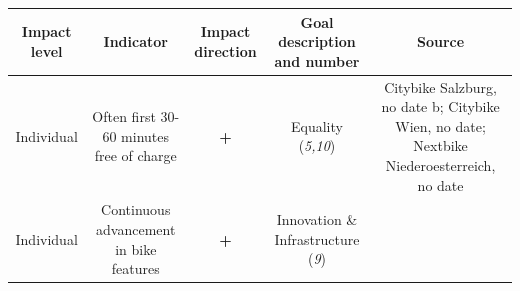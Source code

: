 \documentclass[
]{book}
\begin{document}
\begin{longtable}[]{@{}ccccc@{}}
\toprule
\begin{minipage}[b]{0.17\columnwidth}\centering
Impact level\strut
\end{minipage} & \begin{minipage}[b]{0.16\columnwidth}\centering
Indicator\strut
\end{minipage} & \begin{minipage}[b]{0.17\columnwidth}\centering
Impact direction\strut
\end{minipage} & \begin{minipage}[b]{0.17\columnwidth}\centering
Goal description and number\strut
\end{minipage} & \begin{minipage}[b]{0.17\columnwidth}\centering
Source\strut
\end{minipage}\tabularnewline
\midrule
\endhead
\begin{minipage}[t]{0.17\columnwidth}\centering
Individual\strut
\end{minipage} & \begin{minipage}[t]{0.16\columnwidth}\centering
Often first 30-60 minutes free of charge\strut
\end{minipage} & \begin{minipage}[t]{0.17\columnwidth}\centering
\textbf{+}\strut
\end{minipage} & \begin{minipage}[t]{0.17\columnwidth}\centering
Equality (\emph{5,10})\strut
\end{minipage} & \begin{minipage}[t]{0.17\columnwidth}\centering
Citybike Salzburg, no date b; Citybike Wien, no date; Nextbike Niederoesterreich, no date\strut
\end{minipage}\tabularnewline
\begin{minipage}[t]{0.17\columnwidth}\centering
Individual\strut
\end{minipage} & \begin{minipage}[t]{0.16\columnwidth}\centering
Continuous advancement in bike features\strut
\end{minipage} & \begin{minipage}[t]{0.17\columnwidth}\centering
\textbf{+}\strut
\end{minipage} & \begin{minipage}[t]{0.17\columnwidth}\centering
Innovation \& Infrastructure (\emph{9})\strut
\end{minipage} & \begin{minipage}[t]{0.17\columnwidth}\centering

\end{minipage}
\end{longtable}
\end{document}
